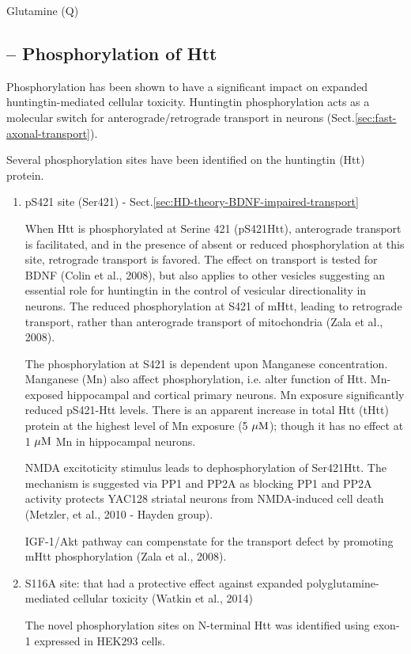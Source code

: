 Glutamine (Q) 

\subsection{-- Phosphorylation of Htt}
\label{sec:mHtt-phosphorylation}

Phosphorylation has been shown to have a significant impact on expanded
huntingtin-mediated cellular toxicity.
Huntingtin phosphorylation acts as a molecular switch for anterograde/retrograde
transport in neurons (Sect.\ref{sec:fast-axonal-transport}).

Several phosphorylation sites have been identified on the huntingtin (Htt)
protein.

\begin{enumerate}
  \item pS421 site (Ser421) - Sect.\ref{sec:HD-theory-BDNF-impaired-transport}

When Htt is phosphorylated at Serine 421 (pS421Htt), anterograde transport is
facilitated, and in the presence of absent or reduced phosphorylation at this
site, retrograde transport is favored. The effect on transport is tested for
BDNF (Colin et al., 2008), but also applies to other vesicles suggesting an
essential role for huntingtin in the control of vesicular directionality in
neurons. The reduced phosphorylation at S421 of mHtt, leading to retrograde
transport, rather than anterograde transport of mitochondria (Zala et al., 2008).

The phosphorylation at S421 is dependent upon Manganese concentration.
Manganese (Mn) also affect phosphorylation, i.e. alter function of Htt.
Mn-exposed hippocampal and cortical primary neurons. Mn exposure significantly
reduced pS421-Htt levels. There is an apparent increase in total Htt (tHtt)
protein at the highest level of Mn exposure (5 ${\mu\text{M}}$); though it has  no effect at 1
${\mu\text{M}}$ Mn in hippocampal neurons.

NMDA excitoticity stimulus leads to dephosphorylation of Ser421Htt. The
mechanism is suggested via PP1 and PP2A as blocking PP1 and PP2A activity
protects YAC128 striatal neurons from NMDA-induced cell death (Metzler,
et al., 2010 - Hayden group).

  
IGF-1/Akt pathway can compenstate for the transport defect by promoting mHtt
phosphorylation (Zala et al., 2008).

  
  \item S116A site: that had a protective effect against expanded
  polyglutamine-mediated cellular toxicity (Watkin et al., 2014)
  
The novel phosphorylation sites on N-terminal Htt was identified using 
exon-1 expressed in HEK293 cells.

  
\end{enumerate}


